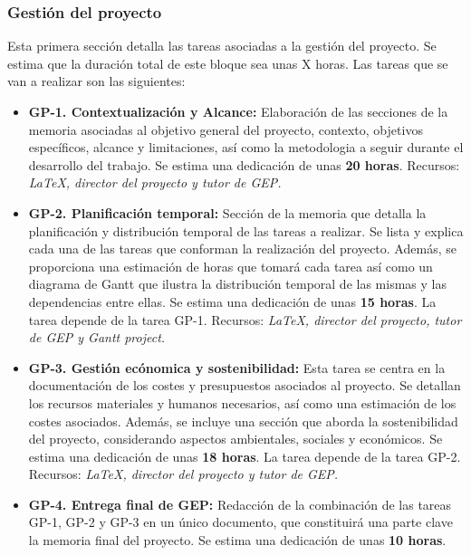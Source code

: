 \subsubsection{Gestión del proyecto}\label{ssec:Descripción de las tareas}
Esta primera sección detalla las tareas asociadas a la gestión del proyecto.
Se estima que la duración total de este bloque sea unas X horas. Las tareas que se van a realizar son las siguientes:
\begin{itemize}
    \item \textbf{GP-1. Contextualización y Alcance:} Elaboración de las secciones de la memoria asociadas 
    al objetivo general del proyecto, contexto, objetivos específicos, alcance y limitaciones, así como la metodologia 
    a seguir durante el desarrollo del trabajo. Se estima una dedicación de unas \textbf{20 horas}.
    \newline Recursos: \textit {LaTeX, director del proyecto y tutor de GEP.}
    \item \textbf{GP-2. Planificación temporal:} Sección de la memoria que detalla la planificación y distribución temporal
    de las tareas a realizar. Se lista y explica cada una de las tareas que conforman la realización del proyecto. Además, se 
    proporciona una estimación de horas que tomará cada tarea así como un diagrama de Gantt que ilustra la distribución 
    temporal de las mismas y las dependencias entre ellas. Se estima una dedicación de unas \textbf{15 horas}. 
    \newline La tarea depende de la tarea GP-1.
    \newline Recursos: \textit {LaTeX, director del proyecto, tutor de GEP y Gantt project.}
    \item \textbf{GP-3. Gestión ecónomica y sostenibilidad:} Esta tarea se centra en la documentación de los costes y presupuestos 
    asociados al proyecto. Se detallan los recursos materiales y humanos necesarios, así como una estimación de los costes 
    asociados. Además, se incluye una sección que aborda la sostenibilidad del proyecto, considerando aspectos ambientales, 
    sociales y económicos. Se estima una dedicación de unas \textbf{18 horas}. 
    \newline La tarea depende de la tarea GP-2.
    \newline Recursos: \textit {LaTeX, director del proyecto y tutor de GEP.}
    \item \textbf{GP-4. Entrega final de GEP:} Redacción de la combinación de las tareas GP-1, GP-2 y GP-3 en un único documento, 
    que constituirá una parte clave la memoria final del proyecto. Se estima una dedicación de unas \textbf{10 horas}. 

\end{itemize}
